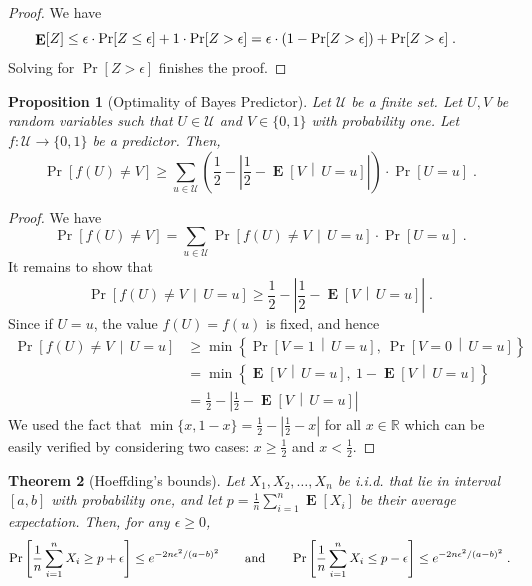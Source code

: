 \documentclass[10pt]{article}
\newtheorem{proposition}{Proposition}
\newtheorem{theorem}[proposition]{Theorem}
\newcommand{\R}{\mathbb{R}}
\newcommand{\U}{\mathcal{U}}
\DeclareMathOperator{\Exp}{\mathbf{E}}
\begin{document}
\begin{proof}
We have
$$
\Exp[Z]
\le \epsilon \cdot \Pr[Z \le \epsilon] + 1 \cdot \Pr[Z > \epsilon]
= \epsilon \cdot (1 - \Pr[Z > \epsilon]) + \Pr[Z > \epsilon] \; .  \qquad \qedhere
$$
Solving for $\Pr[Z > \epsilon]$ finishes the proof.
\end{proof}

\begin{proposition}[Optimality of Bayes Predictor]
\label{proposition:bayes}
Let $\U$ be a finite set. Let $U,V$ be random variables such that $U \in \U$ and $V \in \{0,1\}$ with probability one.
Let $f:\U \to \{0,1\}$ be a predictor. Then,
$$
\Pr\left[ f(U) \neq V \right]
\ge \sum_{u \in \U} \left( \frac{1}{2} - \left| \frac{1}{2} -  \Exp \left[V \, \middle| \, U = u\right] \right| \right) \cdot \Pr[U = u] \; .
$$
\end{proposition}

\begin{proof}
We have
$$
\Pr \left[ f(U) \neq V \right] = \sum_{u \in \U} \Pr \left[ f(U) \neq V \, \middle| \, U = u \right] \cdot \Pr[U = u] \; .
$$
It remains to show that
$$
\Pr\left[ f(U) \neq V \, \middle| \, U = u \right]
\ge
\frac{1}{2} - \left| \frac{1}{2} -  \Exp \left[V \, \middle| \, U = u \right] \right| \; .
$$
Since if  $U=u$, the value $f(U) = f(u)$ is fixed, and hence
\begin{align*}
\Pr\left[ f(U) \neq V \, \middle| \, U = u \right]
& \ge \min\left\{ \Pr \left[ V = 1 \, \middle| \, U = u \right], \ \Pr \left[ V = 0 \, \middle| \, U = u \right] \right\} \\
& = \min\left\{ \Exp \left[ V  \, \middle| \, U = u \right], \ 1 - \Exp \left[ V \, \middle| \, U = u \right] \right\} \\
& = \frac{1}{2} - \left| \frac{1}{2} -  \Exp \left[ V  \, \middle| \, U = u \right] \right|
\end{align*}
We used the fact that $\min\{x, 1 - x\} = \frac{1}{2} - \left| \frac{1}{2} - x \right|$ for all $x \in \R$
which can be easily verified by considering two cases: $x \ge \frac{1}{2}$ and $x < \frac{1}{2}$.
\end{proof}

\begin{theorem}[Hoeffding's bounds]
Let $X_1, X_2, \dots, X_n$ be i.i.d. that lie in interval $[a,b]$ with probability one, and let $p=\frac{1}{n}\sum_{i=1}^n \Exp[X_i]$ be their average expectation.
Then, for any $\epsilon \ge 0$,
$$
\Pr \left[{\frac {1}{n}} \sum_{i=1}^n X_i \ge p + \epsilon \right] \le e^{ - 2n \epsilon^2/(a-b)^2}  \qquad \text{and} \qquad
\Pr \left[{\frac {1}{n}} \sum_{i=1}^n X_i \le p - \epsilon \right] \le e^{ - 2n \epsilon^2/(a-b)^2}  \; . \\
$$
\end{theorem}
\end{document}
